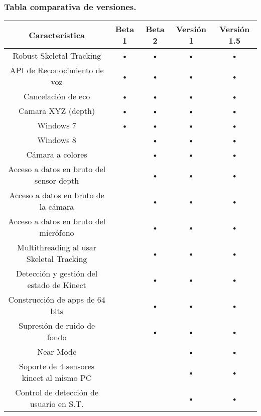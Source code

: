 \documentclass[11pt,a4paper]{article}
\begin{document}
\subsubsection{Tabla comparativa de versiones.}
\begin{tabular}{||c||c||c||c||c||}
\hline Característica                           & Beta 1 & Beta 2 & Versión 1 & Versión 1.5 \\ 
\hline Robust Skeletal Tracking                 & •      & •      & •         & •           \\ 
\hline API de Reconocimiento de voz             & •      & •      & •         & •           \\ 
\hline Cancelación de eco                       & •      & •      & •         & •           \\ 
\hline Camara XYZ (depth)                       & •      & •      & •         & •           \\ 
\hline Windows 7                                & •      & •      & •         & •           \\ 
\hline Windows 8                                &        & •      & •         & •           \\ 
\hline Cámara a colores                         &        & •      & •         & •           \\ 
\hline Acceso a datos en bruto del sensor depth &        & •      & •         & •           \\ 
\hline Acceso a datos en bruto de la cámara     &        & •      & •         & •           \\ 
\hline Acceso a datos en bruto del micrófono    &        & •      & •         & •           \\ 
\hline Multithreading al usar Skeletal Tracking &        & •      & •         & •           \\ 
\hline Detección y gestión del estado de Kinect &        & •      & •         & •           \\ 
\hline Construcción de apps de 64 bits          &        & •      & •         & •           \\ 
\hline Supresión de ruido de fondo              &        & •      & •         & •           \\ 
\hline Near Mode                                &        &        & •         & •           \\
\hline Soporte de 4 sensores kinect al mismo PC &        &        & •         & •           \\ 
\hline Control de detección de usuario en S.T.  &        &        & •         & •           \\ 

\end{tabular}
\end{document}
